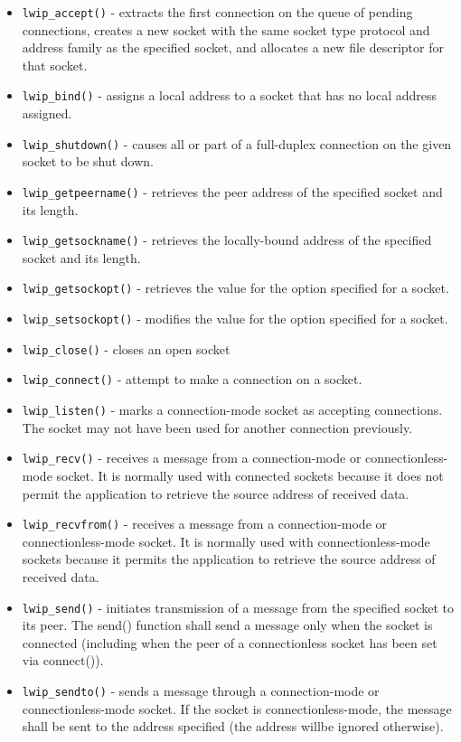 \begin{itemize}
  \item \verb/lwip_accept()/ - extracts the first connection on the queue of pending connections, creates a new socket with the same  socket type protocol and address family as the specified socket, and allocates a new file descriptor for that socket.
  \item \verb/lwip_bind()/ - assigns a local address to a socket that has no local address assigned.
  \item \verb/lwip_shutdown()/ - causes all or part of a full-duplex connection on the given socket to be shut down.
  \item \verb/lwip_getpeername()/ - retrieves the peer address of the specified socket and its length.
  \item \verb/lwip_getsockname()/ - retrieves the locally-bound address of the specified socket and its length.
  \item \verb/lwip_getsockopt()/ - retrieves the value for the option specified for a socket. 
  \item \verb/lwip_setsockopt()/ - modifies the value for the option specified for a socket. 
  \item \verb/lwip_close()/ - closes an open socket
  \item \verb/lwip_connect()/ - attempt to make a connection on a socket.
  \item \verb/lwip_listen()/ - marks a connection-mode socket as accepting connections. The socket may not have been used for another connection previously.
  \item \verb/lwip_recv()/ - receives a message from a connection-mode or connectionless-mode socket. It is normally used with connected sockets because it does not permit the application to retrieve the source address of received data.
  \item \verb/lwip_recvfrom()/ - receives a message from a connection-mode or connectionless-mode socket. It is normally used with  connectionless-mode  sockets because it permits the application to retrieve the source address of received data.
  \item \verb/lwip_send()/ - initiates transmission of a message from the specified socket to its peer. The send() function shall send a message only  when  the socket is connected (including when the peer of a connectionless socket has been set via connect()).
  \item \verb/lwip_sendto()/ - sends a message through a connection-mode or connectionless-mode socket. If the socket is connectionless-mode, the message  shall be sent to the address specified (the address willbe ignored otherwise).

\end{itemize}
